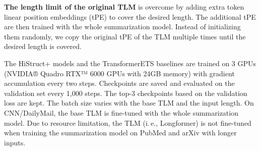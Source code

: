 \documentclass[11pt]{article}
\begin{document}
\textbf{The length limit of the original TLM} is overcome by adding extra token linear position embeddings (tPE) to cover the desired length. The additional tPE are then trained with the whole summarization model. Instead of initializing them randomly, we copy the original tPE of the TLM multiple times until the desired length is covered. 

The HiStruct+ models and the TransformerETS baselines are trained on 3 GPUs (NVIDIA® Quadro RTX™ 6000 GPUs with 24GB memory) with gradient accumulation every two steps. Checkpoints are saved and evaluated on the validation set every 1,000 steps. The top-3 checkpoints based on the validation loss are kept. The batch size varies with the base TLM and the input length. On CNN/DailyMail, the base TLM is fine-tuned with the whole summarization model. Due to resource limitation, the TLM (i.\,e., Longformer) is not fine-tuned when training the summarization model on PubMed and arXiv with longer inputs. 
\end{document}
